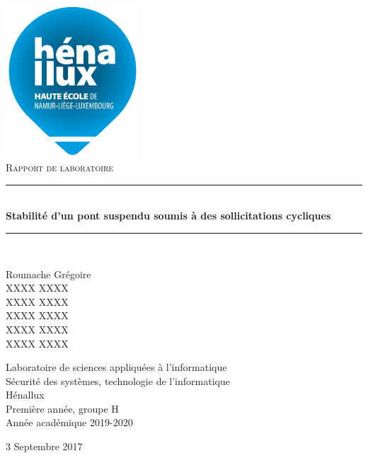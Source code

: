 \documentclass[a4paper]{article}
\newcommand{\HRule}{\rule{\linewidth}{0.5mm}}
\begin{document}
\begin{titlepage}
    \begin{sffamily}
        \begin{center}

            \includegraphics[width=5cm]{images/LogoHenallux.PNG}~\\[1.5cm]
            \textsc{\Large Rapport de laboratoire}\\[1.5cm]

            \HRule \\[0.4cm]
            { \huge \bfseries Stabilité d’un pont suspendu soumis à des sollicitations cycliques\\[0.4cm] }
            \HRule \\[2cm]

            \begin{minipage}{0.4\textwidth}
                \begin{flushleft} \large
                    Roumache Grégoire\\
                    XXXX XXXX\\
                    XXXX XXXX\\
                    XXXX XXXX\\
                    XXXX XXXX\\
                    XXXX XXXX\\
                \end{flushleft}
            \end{minipage}
            \begin{minipage}{0.55\textwidth}
                \begin{flushright} \large
                    Laboratoire de sciences appliquées à l'informatique\\
                    Sécurité des systèmes, technologie de l'informatique\\
                    Hénallux\\
                    Première année, groupe H \\
                    Année académique 2019-2020\\
                \end{flushright}
            \end{minipage}
            \vfill

            {\large 3 Septembre 2017}

        \end{center}
    \end{sffamily}
\end{titlepage}
\end{document}
